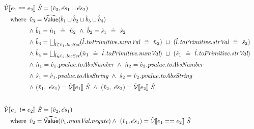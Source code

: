 \[
\renewcommand\arraystretch{1.5}
\begin{array}{l}

\aV \lbr e_1 ~\verb+==+~ e_2 \rbr\ \hat{S} = (\hat{v}_3, \hat{es}_1 \sqcup \hat{es}_2) \\
\quad\wherec{
\hat{v}_3 = \abs{Value}(\hat{b}_1 \sqcup \hat{b}_2 \sqcup \hat{b}_3 \sqcup \hat{b}_4) \\
\land\ \hat{b}_1 = \hat{n}_1 ~~\hat{=}~~ \hat{n}_2 \
\land\ \hat{b}_2 = \hat{s}_1 ~~\hat{=}~~ \hat{s}_2 \\
\land\ \hat{b}_3 = \bigsqcup_{\hat{l} \in \hat{v}_1\emph{.locSet}}
(\hat{l}\emph{.toPrimitive.numVal} ~~\hat{=}~~ \hat{n}_2 )\ \sqcup\ (\hat{l}\emph{.toPrimitive.strVal} ~~\hat{=}~~ \hat{s}_2) \\
\land\ \hat{b}_4 = \bigsqcup_{\hat{l} \in \hat{v}_2\emph{.locSet}} 
(\hat{n}_1 ~~\hat{=}~~ \hat{l}\emph{.toPrimitive.numVal} )\ \sqcup\ (\hat{s}_1 ~~\hat{=}~~ \hat{l}\emph{.toPrimitive.strVal}) \\
\land\ \hat{n}_1 = \hat{v}_1\emph{.pvalue.toAbsNumber} \
\land\ \hat{n}_2 = \hat{v}_2\emph{.pvalue.toAbsNumber} \\
\land\ \hat{s}_1 = \hat{v}_1\emph{.pvalue.toAbsString} \
\land\ \hat{s}_2 = \hat{v}_2\emph{.pvalue.toAbsString} \\
\land\ (\hat{v}_1,\ \hat{es}_1) = \aV \lbr e_1 \rbr\ \hat{S} \
\land\ (\hat{v}_2,\ \hat{es}_2) = \aV \lbr e_2 \rbr\ \hat{S}
}\\\\

\aV \lbr e_1 ~\verb+!=+~ e_2 \rbr\ \hat{S} = (\hat{v}_2, \hat{es}_1) \\
\quad\wherec{
\hat{v}_2 = \abs{Value}(\hat{v}_1\emph{.numVal.negate})
\land\ (\hat{v}_1, \hat{es}_1) = \aV \lbr e_1 == e_2 \rbr\ \hat{S}
}\\\\


\end{array}\]
